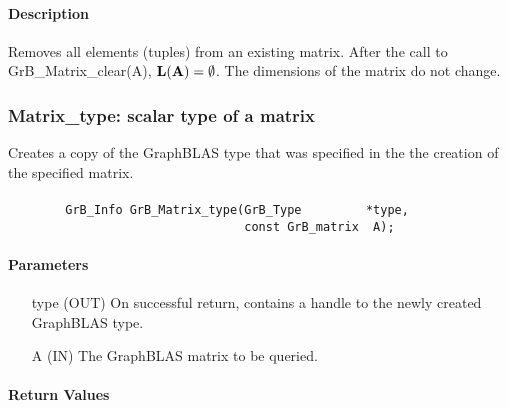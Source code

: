 \paragraph{Description}

Removes all elements (tuples) from an existing matrix. After the call to
{\sf GrB\_Matrix\_clear(A)},
$\mathbf{L}({\bf A}) = \emptyset$. The dimensions of the matrix do not change.

\subsubsection{{\sf Matrix\_type}: scalar type of a matrix}

Creates a copy of the GraphBLAS type that was specified in the the creation of
the specified matrix.

\paragraph{\syntax}

\begin{verbatim}
        GrB_Info GrB_Matrix_type(GrB_Type         *type,
                                 const GrB_matrix  A);
\end{verbatim}

\paragraph{Parameters}

\begin{itemize}[leftmargin=1.1in]
    \item[{\sf type}] ({\sf OUT}) On successful return, contains a handle
                                  to the newly created GraphBLAS type.
    \item[{\sf A}]    ({\sf IN})  The GraphBLAS matrix to be queried.
\end{itemize}

\paragraph{Return Values}

